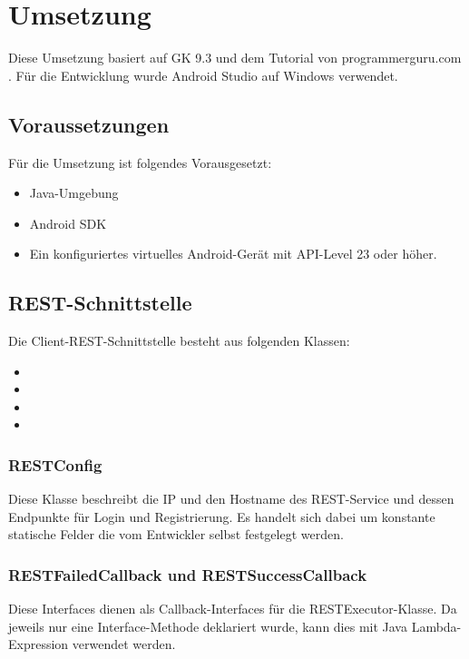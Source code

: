 
\section{Umsetzung}

Diese Umsetzung basiert auf GK 9.3 und dem Tutorial von programmerguru.com \cite{programmerguru-online}. Für die Entwicklung wurde Android Studio auf Windows verwendet. 

\subsection{Voraussetzungen}
Für die Umsetzung ist folgendes Vorausgesetzt:
\begin{itemize}
	\item Java-Umgebung
	\item Android SDK
	\item Ein konfiguriertes virtuelles Android-Gerät mit API-Level 23 oder höher. 
\end{itemize}

\subsection{REST-Schnittstelle}
Die Client-REST-Schnittstelle besteht aus folgenden Klassen:
\begin{itemize}
	\item {}
	\item {}
	\item {}
	\item {}
\end{itemize}

\subsubsection{RESTConfig}
Diese Klasse beschreibt die IP und den Hostname des REST-Service und dessen Endpunkte für Login und Registrierung. Es handelt sich dabei um konstante statische Felder die vom Entwickler selbst festgelegt werden.

\subsubsection{RESTFailedCallback und RESTSuccessCallback}
Diese Interfaces dienen als Callback-Interfaces für die RESTExecutor-Klasse. Da jeweils nur eine Interface-Methode deklariert wurde, kann dies mit Java Lambda-Expression verwendet werden.

